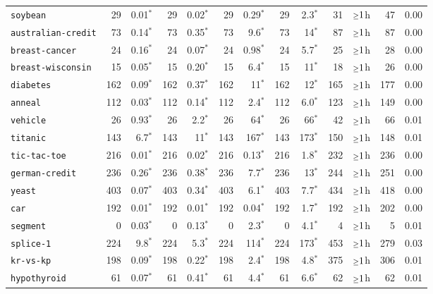\begin{tabular}{lrrrrrrrrrrrr}
\texttt{soybean} & 29 & 0.01$^*$ & 29 & 0.02$^*$ & 29 & 0.29$^*$ & 29 & 2.3$^*$ & 31 & $\mathsmaller{\geq}1$h & 47 & 0.00\\
\texttt{australian-credit} & 73 & 0.14$^*$ & 73 & 0.35$^*$ & 73 & 9.6$^*$ & 73 & 14$^*$ & 87 & $\mathsmaller{\geq}1$h & 87 & 0.00\\
\texttt{breast-cancer} & 24 & 0.16$^*$ & 24 & 0.07$^*$ & 24 & 0.98$^*$ & 24 & 5.7$^*$ & 25 & $\mathsmaller{\geq}1$h & 28 & 0.00\\
\texttt{breast-wisconsin} & 15 & 0.05$^*$ & 15 & 0.20$^*$ & 15 & 6.4$^*$ & 15 & 11$^*$ & 18 & $\mathsmaller{\geq}1$h & 26 & 0.00\\
\texttt{diabetes} & 162 & 0.09$^*$ & 162 & 0.37$^*$ & 162 & 11$^*$ & 162 & 12$^*$ & 165 & $\mathsmaller{\geq}1$h & 177 & 0.00\\
\texttt{anneal} & 112 & 0.03$^*$ & 112 & 0.14$^*$ & 112 & 2.4$^*$ & 112 & 6.0$^*$ & 123 & $\mathsmaller{\geq}1$h & 149 & 0.00\\
\texttt{vehicle} & 26 & 0.93$^*$ & 26 & 2.2$^*$ & 26 & 64$^*$ & 26 & 66$^*$ & 42 & $\mathsmaller{\geq}1$h & 66 & 0.01\\
\texttt{titanic} & 143 & 6.7$^*$ & 143 & 11$^*$ & 143 & 167$^*$ & 143 & 173$^*$ & 150 & $\mathsmaller{\geq}1$h & 148 & 0.01\\
\texttt{tic-tac-toe} & 216 & 0.01$^*$ & 216 & 0.02$^*$ & 216 & 0.13$^*$ & 216 & 1.8$^*$ & 232 & $\mathsmaller{\geq}1$h & 236 & 0.00\\
\texttt{german-credit} & 236 & 0.26$^*$ & 236 & 0.38$^*$ & 236 & 7.7$^*$ & 236 & 13$^*$ & 244 & $\mathsmaller{\geq}1$h & 251 & 0.00\\
\texttt{yeast} & 403 & 0.07$^*$ & 403 & 0.34$^*$ & 403 & 6.1$^*$ & 403 & 7.7$^*$ & 434 & $\mathsmaller{\geq}1$h & 418 & 0.00\\
\texttt{car} & 192 & 0.01$^*$ & 192 & 0.01$^*$ & 192 & 0.04$^*$ & 192 & 1.7$^*$ & 192 & $\mathsmaller{\geq}1$h & 202 & 0.00\\
\texttt{segment} & 0 & 0.03$^*$ & 0 & 0.13$^*$ & 0 & 2.3$^*$ & 0 & 4.1$^*$ & 4 & $\mathsmaller{\geq}1$h & 5 & 0.01\\
\texttt{splice-1} & 224 & 9.8$^*$ & 224 & 5.3$^*$ & 224 & 114$^*$ & 224 & 173$^*$ & 453 & $\mathsmaller{\geq}1$h & 279 & 0.03\\
\texttt{kr-vs-kp} & 198 & 0.09$^*$ & 198 & 0.22$^*$ & 198 & 2.4$^*$ & 198 & 4.8$^*$ & 375 & $\mathsmaller{\geq}1$h & 306 & 0.01\\
\texttt{hypothyroid} & 61 & 0.07$^*$ & 61 & 0.41$^*$ & 61 & 4.4$^*$ & 61 & 6.6$^*$ & 62 & $\mathsmaller{\geq}1$h & 62 & 0.01\\

\end{tabular}
